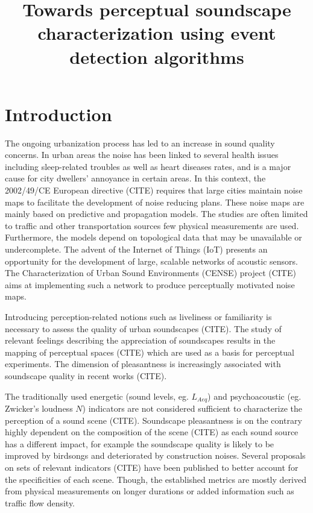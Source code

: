 \documentclass{article}
\title{Towards perceptual soundscape characterization using event detection algorithms}
\begin{document}
\ninept
\maketitle

\begin{sloppy}

\begin{abstract}

\end{abstract}

\begin{keywords}
\end{keywords}


\section{Introduction}
\label{sec:intro}

The ongoing urbanization process has led to an increase in sound quality concerns. In urban areas the noise has been linked to several health issues including sleep-related troubles as well as heart diseases rates, and is a major cause for city dwellers' annoyance in certain areas. In this context, the 2002/49/CE European directive (CITE) requires that large cities maintain noise maps to facilitate the development of noise reducing plans. These noise maps are mainly based on predictive and propagation models. The studies are often limited to traffic and other transportation sources few physical measurements are used. Furthermore, the models depend on topological data that may be unavailable or undercomplete. The advent of the Internet of Things (IoT) presents an opportunity for the development of large, scalable networks of acoustic sensors. The Characterization of Urban Sound Environments (CENSE) project (CITE) aims at implementing such a network to produce perceptually motivated noise maps.

Introducing perception-related notions such as liveliness or familiarity is necessary to assess the quality of urban soundscapes (CITE). The study of relevant feelings describing the appreciation of soundscapes results in the mapping of perceptual spaces (CITE) which are used as a basis for perceptual experiments. The dimension of pleasantness is increasingly associated with soundscape quality in recent works (CITE).

The traditionally used energetic (sound levels, eg. $L_{Aeq}$) and psychoacoustic (eg. Zwicker's loudness $N$) indicators are not considered sufficient to characterize the perception of a sound scene (CITE). Soundscape pleasantness is on the contrary highly dependent on the composition of the scene (CITE) as each sound source has a different impact, for example the soundscape quality is likely to be improved by birdsongs and deteriorated by construction noises. Several proposals on sets of relevant indicators (CITE) have been published to better account for the specificities of each scene. Though, the established metrics are mostly derived from physical measurements on longer durations or added information such as traffic flow density.


\end{sloppy}
\end{document}
